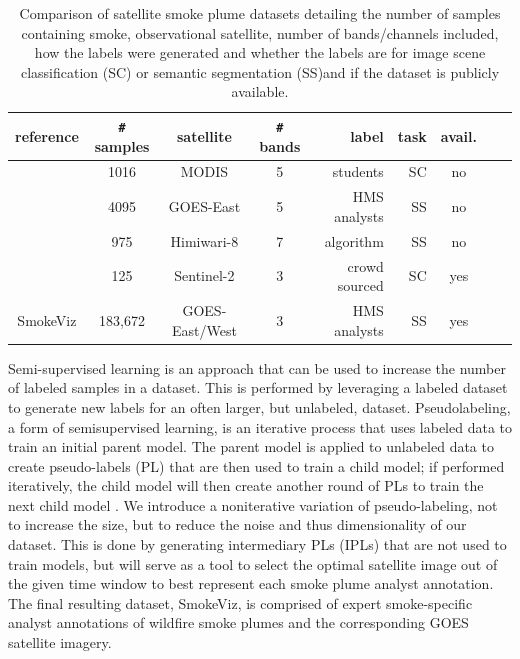 \documentclass{article}
\begin{document}
\begin{table}[h]
    \caption{Comparison of satellite smoke plume datasets detailing the number of samples containing smoke, observational satellite, number of bands/channels included, how the labels were generated and whether the labels are for image scene classification (SC) or semantic segmentation (SS)and if the dataset is publicly available.}\label{studies}
    \centering
    \begin{tabular}{ccccrrcrc}
        \toprule
        reference & \verb|#| samples & satellite & \verb|#| bands & label & task & avail.\\
        \midrule
        \cite{smokenet}& 1016 & MODIS & 5 & students & SC & no \\
        \cite{smoke_goes}& 4095 & GOES-East & 5 & HMS analysts & SS & no \\
        \cite{larsen} & 975 & Himiwari-8 & 7 & algorithm& SS & no \\
        \cite{satlas} & 125 & Sentinel-2 & 3 & crowd sourced & SC & yes \\
        SmokeViz  & 183,672 & GOES-East/West & 3 & HMS analysts & SS & yes \\
        \bottomrule
    \end{tabular}
\end{table}

Semi-supervised learning is an approach that can be used to increase the number of labeled samples in a dataset. This is performed by leveraging a labeled dataset to generate new labels for an often larger, but unlabeled, dataset. Pseudolabeling, a form of semisupervised learning, is an iterative process that uses labeled data to train an initial parent model. The parent model is applied to unlabeled data to create pseudo-labels (PL) that are then used to train a child model; if performed iteratively, the child model will then create another round of PLs to train the next child model \cite{pseudo}. We introduce a noniterative variation of pseudo-labeling, not to increase the size, but to reduce the noise and thus dimensionality of our dataset. This is done by generating intermediary PLs (IPLs) that are not used to train models, but will serve as a tool to select the optimal satellite image out of the given time window to best represent each smoke plume analyst annotation. The final resulting dataset, SmokeViz, is comprised of expert smoke-specific analyst annotations of wildfire smoke plumes and the corresponding GOES satellite imagery.
\end{document}
